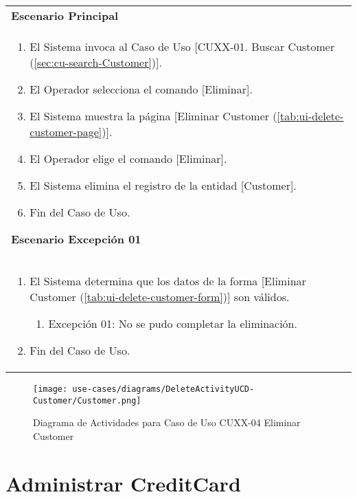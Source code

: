	\begin{tabular}{ p{15.5cm} }
		\textbf{Escenario Principal} \\
		\begin{enumerate}
			\item El Sistema invoca al Caso de Uso [CUXX-01. Buscar Customer (\ref{sec:cu-search-Customer})].
			\item El Operador selecciona el comando [Eliminar].
			\item El Sistema muestra la p\'agina [Eliminar Customer (\ref{tab:ui-delete-customer-page})].
			\item El Operador elige el comando [Eliminar].
			\item El Sistema elimina el registro de la entidad [Customer].
			\item Fin del Caso de Uso.
		\end{enumerate}
		\textbf{Escenario Excepci\'on 01} \\
		\begin{enumerate}
		   \item El Sistema determina que los datos de la forma [Eliminar Customer (\ref{tab:ui-delete-customer-form})] son v\'alidos.
		   	\begin{enumerate}
		   		\item Excepci\'on 01: No se pudo completar la eliminaci\'on.
		    \end{enumerate}
		   \item Fin del Caso de Uso.
		\end{enumerate}
	\end{tabular}
	
	\begin{figure}[H]
	  \begin{center}
		 \label{tab:activity-delete-ucd-entity-customer}
		 \texttt{[image: use-cases/diagrams/DeleteActivityUCD-Customer/Customer.png]}
		 \caption{Diagrama de Actividades para Caso de Uso CUXX-04 Eliminar Customer}
	  \end{center}
	\end{figure}
	
	\clearpage
	\section{Administrar CreditCard} \label{sec:cf-uc-admin-creditcard}
	
